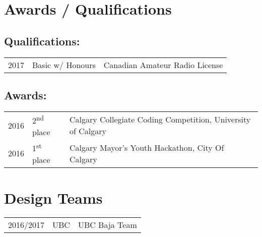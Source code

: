 \documentclass[]{deedy-resume-openfont}
\begin{document}
\begin{minipage}[t]{0.66\textwidth}

\section{Awards / Qualifications} 
\subsection{Qualifications:}
\begin{tabular}{rll}
2017         & Basic w/ Honours  & Canadian Amateur Radio License\\
\end{tabular}

\subsection{Awards:}
\begin{tabular}{rll}
2016         & 2\textsuperscript{nd} place  & Calgary Collegiate Coding Competition, University of Calgary\\
2016         & 1\textsuperscript{st} place & Calgary Mayor's Youth Hackathon, City Of Calgary\\
\end{tabular}
\sectionsep


\section{Design Teams} 

\begin{tabular}{rll}
2016/2017   & UBC   & UBC Baja Team\\
\end{tabular}
\sectionsep

\end{minipage} 
\end{document}
